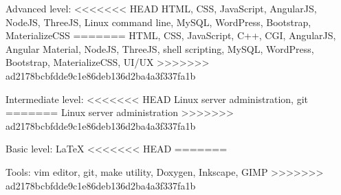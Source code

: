 \cventry{}
    {Advanced level:}
    {}
<<<<<<< HEAD
    {HTML, CSS, JavaScript, AngularJS, NodeJS, ThreeJS, Linux command line, MySQL, WordPress, Bootstrap, MaterializeCSS}
=======
    {HTML, CSS, JavaScript, C++, CGI, AngularJS, Angular Material, NodeJS, ThreeJS, shell scripting, MySQL, WordPress, Bootstrap, MaterializeCSS, UI/UX}
>>>>>>> ad2178bcbfdde9c1e86deb136d2ba4a3f337fa1b
    {}
    {}

\cventry{}
    {Intermediate level:}
    {}
<<<<<<< HEAD
    {Linux server administration, git}
=======
    {Linux server administration}
>>>>>>> ad2178bcbfdde9c1e86deb136d2ba4a3f337fa1b
    {}
    {}

\cventry{}
    {Basic level:}
    {}
    {\LaTeX}
<<<<<<< HEAD
=======
    {}
    {}

\cventry{}
    {Tools:}
    {}
    {vim editor, git, make utility, Doxygen, Inkscape, GIMP}
>>>>>>> ad2178bcbfdde9c1e86deb136d2ba4a3f337fa1b
    {}
    {}
